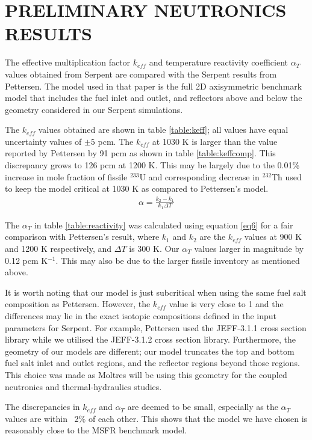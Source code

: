 \documentclass{anstrans}
\begin{document}
\section{PRELIMINARY NEUTRONICS RESULTS}

The effective multiplication factor $k_{eff}$ and temperature reactivity coefficient $\alpha_T$ values obtained from Serpent are compared with the Serpent results from Pettersen. The model used in that paper is the full 2D axisymmetric benchmark model that includes the fuel inlet and outlet, and reflectors above and below the geometry considered in our Serpent simulations.

The $k_{eff}$ values obtained are shown in table \ref{table:keff}; all values have equal uncertainty values of $\pm 5$ pcm. The $k_{eff}$ at 1030 K is larger than the value reported by Pettersen by 91 pcm as shown in table \ref{table:keffcomp}. This discrepancy grows to 126 pcm at 1200 K. This may be largely due to the 0.01\% increase in mole fraction of fissile $^{233}$U and corresponding decrease in $^{232}$Th used to keep the model critical at 1030 K as compared to Pettersen's model.
%
\begin{align}
\alpha = \frac{k_2 - k_1}{k_1 \Delta T} \label{eq6}
\end{align}

The $\alpha_T$ in table \ref{table:reactivity} was calculated using equation \ref{eq6} for a fair comparison with Pettersen's result, where $k_1$ and $k_2$ are the $k_{eff}$ values at 900 K and 1200 K respectively, and $\Delta T$ is 300 K. Our $\alpha_T$ values larger in magnitude by 0.12 pcm K$^{-1}$. This may also be due to the larger fissile inventory as mentioned above.

It is worth noting that our model is just subcritical when using the same fuel salt composition as Pettersen. However, the $k_{eff}$ value is very close to 1 and the differences may lie in the exact isotopic compositions defined in the input parameters for Serpent. For example, Pettersen used the JEFF-3.1.1 cross section library while we utilised the JEFF-3.1.2 cross section library. Furthermore, the geometry of our models are different; our model truncates the top and bottom fuel salt inlet and outlet regions, and the reflector regions beyond those regions. This choice was made as Moltres will be using this geometry for the coupled neutronics and thermal-hydraulics studies.

The discrepancies in $k_{eff}$ and $\alpha_T$ are deemed to be small, especially as the $\alpha_T$ values are within ~2\% of each other. This shows that the model we have chosen is reasonably close to the MSFR benchmark model.
\end{document}
